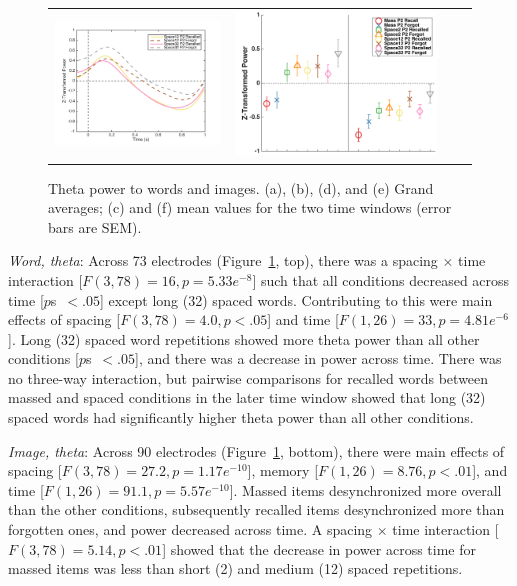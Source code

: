 \begin{figure}[H]
\begin{tabular}{cccc}
  \includegraphics[width=.29\textwidth]{./figs/exp2/tfr_line/tfr_line_ga_img_rc_spac12_p2_img_fo_spac12_p2_img_rc_spac32_p2_img_fo_spac32_p2_4_8_-100_1000_90ROIs_legend} &
  \includegraphics[width=.30\textwidth]{./figs/exp2/tfr_avg/tfr_avg_ga_img_rc_mass_p2_img_fo_mass_p2_img_rc_spac2_p2_img_fo_spac2_p2_img_rc_spac12_p2_img_fo_spac12_p2_img_rc_spac32_p2_img_fo_spac32_p2_4_8_0_500_500_1000_90ROI_ylabel} \\
  \end{tabular}
  \caption{Theta power to words and images.  (a), (b), (d), and (e) Grand averages; (c) and (f) mean values for the two time windows (error bars are SEM).}
  \label{fig:s2_word_img_theta}
\end{figure}

\textit{Word, theta}: Across 73 electrodes (Figure~\ref{fig:s2_word_img_theta}, top), there was a spacing $\times$ time interaction [$F(3,78)=16, p=5.33e^{-8}$] such that all conditions decreased across time [$p$s~$<.05$] except long (32) spaced words.  Contributing to this were main effects of spacing [$F(3,78)=4.0, p<.05$] and time [$F(1,26)=33, p=4.81e^{-6}$].  Long (32) spaced word repetitions showed more theta power than all other conditions [$p$s~$<.05$], and there was a decrease in power across time.
There was no three-way interaction, but pairwise comparisons for recalled words between massed and spaced conditions in the later time window showed that long (32) spaced words had significantly higher theta power than all other conditions.

\textit{Image, theta}: Across 90 electrodes (Figure~\ref{fig:s2_word_img_theta}, bottom), there were main effects of spacing [$F(3,78)=27.2, p=1.17e^{-10}$], memory [$F(1,26)=8.76, p<.01$], and time [$F(1,26)=91.1, p=5.57e^{-10}$].  Massed items desynchronized more overall than the other conditions, subsequently recalled items desynchronized more than forgotten ones, and power decreased across time.  A spacing $\times$ time interaction [$F(3,78)=5.14, p<.01$] showed that the decrease in power across time for massed items was less than short (2) and medium (12) spaced repetitions.

